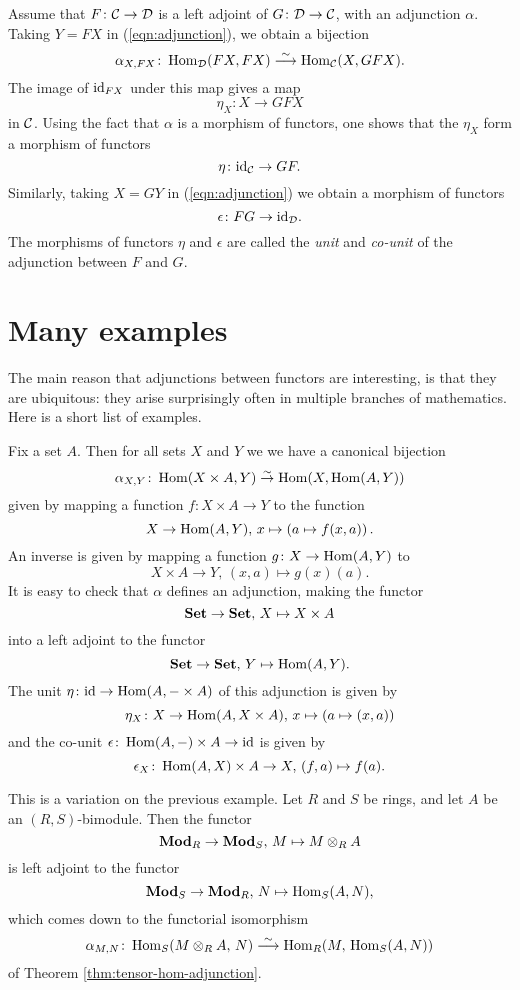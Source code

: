 Assume that $F\colon {\mathcal{C}} \to {\mathcal{D}}$ is a left adjoint of $G\colon {\mathcal{D}} \to {\mathcal{C}}$, with an adjunction $\alpha$. 
Taking $Y=FX$ in (\ref{eqn:adjunction}), we obtain a bijection 
\[
	\alpha_{X,FX}\colon \operatorname{Hom}_{\mathcal{D}}(FX,FX) \overset{\sim}{\longrightarrow} \operatorname{Hom}_{\mathcal{C}}(X,GFX).
\]
The image of ${\rm id}_{FX}$ under this map gives a map
\[
	\eta_X \colon X \to GFX
\]
in ${\mathcal{C}}$. Using the fact that $\alpha$ is a morphism of functors, one shows that the $\eta_X$ form a morphism of functors
\[
	\eta\colon {\rm id}_{\mathcal{C}} \to GF.
\]
Similarly, taking $X=GY$ in (\ref{eqn:adjunction}) we obtain a morphism of functors
\[
	\epsilon\colon FG \to {\rm id}_{\mathcal{D}}.
\]
The morphisms of functors $\eta$ and $\epsilon$ are called the \emph{unit} and \emph{co-unit} of the adjunction between $F$ and $G$.


\section{Many examples}


The main reason that adjunctions between functors are interesting, is that they are ubiquitous: they arise surprisingly often in multiple branches of mathematics. Here is a short list of examples.

\begin{example}
Fix a set $A$. Then for all sets $X$ and $Y$ we we have a canonical bijection
\[
	\alpha_{X,Y}\colon \operatorname{Hom}(X\times A, Y ) \overset{\sim}{\to} \operatorname{Hom}(X, \operatorname{Hom}(A,Y))
\]
given  by mapping a function $f\colon X\times A \to Y$ to the function
\[
	X \to \operatorname{Hom}(A,Y),\, x \mapsto \left( a \mapsto f(x,a) \right).
\]
An inverse is given by mapping a function $g\colon X\to \operatorname{Hom}(A,Y)$ to
\[
	X\times A\to Y,\, (x,a) \mapsto g(x)(a).
\]
It is easy to check that $\alpha$ defines an adjunction, making the functor
\[
	\mathbf{Set} \to \mathbf{Set},\,X \mapsto X \times A
\]
into a left adjoint to the functor
\[
	\mathbf{Set} \to \mathbf{Set},\, Y \mapsto \operatorname{Hom}(A,Y).
\]
The unit $\eta\colon {\rm id} \to \operatorname{Hom}(A,-\times A)$ of this adjunction is given by
\[
	\eta_X \colon X \to \operatorname{Hom}(A,X\times A),\, x \mapsto \left( a \mapsto (x,a) \right)
\]
and the co-unit $\epsilon\colon \operatorname{Hom}(A,-)\times A\to {\rm id}$ is given by
\[
	\epsilon_X \colon \operatorname{Hom}(A,X)\times A \to X,\, (f,a) \mapsto f(a).
\]
\end{example}

\begin{example}
This is a variation on the previous example. Let $R$ and $S$ be rings, and let  $A$ be an $(R,S)$-bimodule. Then the functor
\[
	\mathbf{Mod}_{R} \to \mathbf{Mod}_S,\, M \mapsto  M \otimes_R A
\]
is left adjoint to the functor
\[
	\mathbf{Mod}_S \to \mathbf{Mod}_R,\, N \mapsto \operatorname{Hom}_S(A,N),
\]
which comes down to the functorial isomorphism
\[
	\alpha_{M,N}\colon \operatorname{Hom}_S( M \otimes_R A,\, N ) \overset{\sim}{\longrightarrow} \operatorname{Hom}_R( M,\, \operatorname{Hom}_S(A,N) )
\]
of Theorem \ref{thm:tensor-hom-adjunction}.
\end{example}


